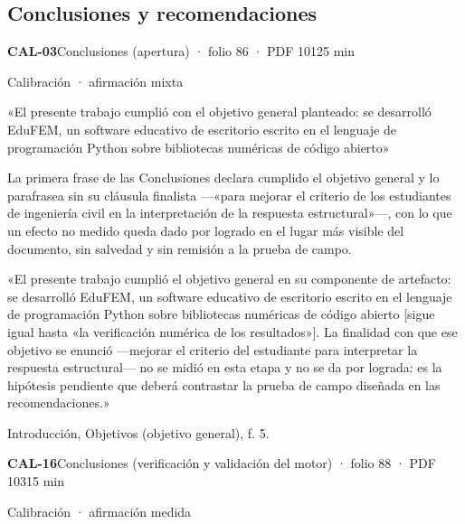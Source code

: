\subsection{Conclusiones y recomendaciones}
\noindent\casilla\textbf{CAL-03}\quad{}\quad Conclusiones (apertura) · folio 86 · PDF 101\hfill 25 min\par\vspace{1pt}
{\small\color{gris}Calibración · afirmación mixta}\par
\begin{dice}«El presente trabajo cumplió con el objetivo general planteado: se desarrolló EduFEM, un software educativo de escritorio escrito en el lenguaje de programación Python sobre bibliotecas numéricas de código abierto»\end{dice}
{\small{}La primera frase de las Conclusiones declara cumplido el objetivo general y lo parafrasea sin su cláusula finalista —«para mejorar el criterio de los estudiantes de ingeniería civil en la interpretación de la respuesta estructural»—, con lo que un efecto no medido queda dado por logrado en el lugar más visible del documento, sin salvedad y sin remisión a la prueba de campo.\par}
\begin{debedecir}«El presente trabajo cumplió el objetivo general en su componente de artefacto: se desarrolló EduFEM, un software educativo de escritorio escrito en el lenguaje de programación Python sobre bibliotecas numéricas de código abierto [sigue igual hasta «la verificación numérica de los resultados»]\allowbreak{}. La finalidad con que ese objetivo se enunció —mejorar el criterio del estudiante para interpretar la respuesta estructural— no se midió en esta etapa y no se da por lograda: es la hipótesis pendiente que deberá contrastar la prueba de campo diseñada en las recomendaciones.»\end{debedecir}
{\small{}Introducción, Objetivos (objetivo general), f. 5.\par}
\vspace{6pt}
\noindent\casilla\textbf{CAL-16}\quad{}\quad Conclusiones (verificación y validación del motor) · folio 88 · PDF 103\hfill 15 min\par\vspace{1pt}
{\small\color{gris}Calibración · afirmación medida}\par
